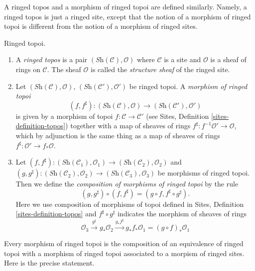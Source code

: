 \noindent
A ringed topos and a morphism of ringed topoi are defined similarly.
Namely, a ringed topos is just a ringed site, except that the notion of
a morphism of ringed topoi is different from the notion of a morphism
of ringed sites.

\begin{definition}
\label{definition-ringed-topos}
Ringed topoi.
\begin{enumerate}
\item A {\it ringed topos} is a pair
$(\textit{Sh}(\mathcal{C}), \mathcal{O})$
where $\mathcal{C}$ is a site and $\mathcal{O}$ is a sheaf of rings
on $\mathcal{C}$. The sheaf $\mathcal{O}$ is called the
{\it structure sheaf} of the ringed site.
\item Let $(\textit{Sh}(\mathcal{C}), \mathcal{O})$,
$(\textit{Sh}(\mathcal{C}'), \mathcal{O}')$ be ringed topoi.
A {\it morphism of ringed topoi}
$$
(f, f^\sharp) :
(\textit{Sh}(\mathcal{C}), \mathcal{O})
\longrightarrow
(\textit{Sh}(\mathcal{C}'), \mathcal{O}')
$$
is given by a morphism of topoi $f : \mathcal{C} \to \mathcal{C}'$
(see Sites, Definition \ref{sites-definition-topos})
together with a map of sheaves of rings
$f^\sharp : f^{-1}\mathcal{O}' \to \mathcal{O}$, which by adjunction
is the same thing as a map of sheaves of rings
$f^\sharp : \mathcal{O}' \to f_*\mathcal{O}$.
\item Let
$(f, f^\sharp) :
(\textit{Sh}(\mathcal{C}_1), \mathcal{O}_1)
\to (\textit{Sh}(\mathcal{C}_2), \mathcal{O}_2)$ and
$(g, g^\sharp) :
(\textit{Sh}(\mathcal{C}_2), \mathcal{O}_2) \to
(\textit{Sh}(\mathcal{C}_3), \mathcal{O}_3)$
be morphisms of ringed topoi. Then we define
the {\it composition of morphisms of ringed topoi}
by the rule
$$
(g, g^\sharp) \circ (f, f^\sharp) = (g \circ f, f^\sharp \circ g^\sharp).
$$
Here we use composition of morphisms of topoi defined in
Sites, Definition \ref{sites-definition-topos}
and $f^\sharp \circ g^\sharp$ indicates the morphism of sheaves of
rings
$$
\mathcal{O}_3 \xrightarrow{g^\sharp} g_*\mathcal{O}_2
\xrightarrow{g_*f^\sharp} g_*f_*\mathcal{O}_1 = (g \circ f)_*\mathcal{O}_1
$$
\end{enumerate}
\end{definition}

\noindent
Every morphism of ringed topoi is the composition of an equivalence
of ringed topoi with a morphism of ringed topoi associated to a morpism
of ringed sites. Here is the precise statement.

